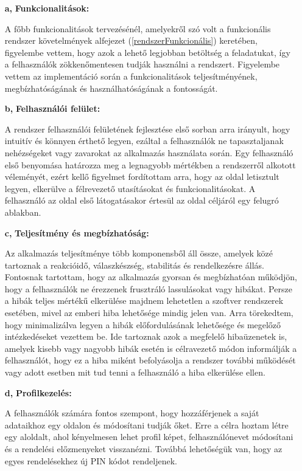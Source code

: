 \begin{itemize}
  	\item[\textbf{a,}] \textbf{Funkcionalitások:}

A főbb funkcionalitások tervezésénél, amelyekről szó volt a funkcionális rendszer követelmények alfejezet (\ref{rendszerFunkcionális}) keretében, figyelembe vettem, hogy azok a lehető legjobban betöltség a feladatukat, így a felhasználók zökkenőmentesen tudják használni a rendszert. Figyelembe vettem az implementáció során a funkcionalitások teljesítményének, megbízhatóságának és használhatóságának a fontosságát.

	\item[\textbf{b,}] \textbf{Felhasználói felület:}

A rendszer felhasználói felületének fejlesztése első sorban arra irányult, hogy intuitív és könnyen érthető legyen, ezáltal a felhasználók ne tapasztaljanak nehézségeket vagy zavarokat az alkalmazás használata során. Egy felhasználó első benyomása határozza meg a legnagyobb mértékben a rendszerről alkotott véleményét, ezért kellő figyelmet fordítottam arra, hogy az oldal letisztult legyen, elkerülve a félrevezető utasításokat és funkcionalitásokat. A felhasználó az oldal első látogatásakor értesül az oldal céljáról egy felugró ablakban.

	\item[\textbf{c,}] \textbf{Teljesítmény és megbízhatóság:}

Az alkalmazás teljesítménye több komponensből áll össze, amelyek közé tartoznak a reakcióidő, válaszkészség, stabilitás és rendelkezésre állás. Fontosnak tartottam, hogy az alkalmazás gyorsan és megbízhatóan működjön, hogy a felhasználók ne érezzenek frusztráló lassulásokat vagy hibákat. Persze a hibák teljes mértékű elkerülése majdnem lehetetlen a szoftver rendszerek esetében, mivel az emberi hiba lehetősége mindig jelen van. Arra törekedtem, hogy minimalizálva legyen a hibák előfordulásának lehetősége és megelőző intézkedéseket vezettem be. Ide tartoznak azok a megfelelő hibaüzenetek is, amelyek kisebb vagy nagyobb hibák esetén is célravezető módon informálják a felhasználót, hogy ez a hiba miként befolyásolja a rendszer további működését vagy adott esetben mit tud tenni a felhasználó a hiba elkerülése ellen.

	\item[\textbf{d,}] \textbf{Profilkezelés:}

A felhasználók számára fontos szempont, hogy hozzáférjenek a saját adataikhoz egy oldalon és módosítani tudják őket. Erre a célra hoztam létre egy aloldalt, ahol kényelmesen lehet profil képet, felhasználónevet módosítani és a rendelési előzmenyeket visszanézni. Továbbá lehetőségük van, hogy az egyes rendelésekhez új PIN kódot rendeljenek.


\end{itemize}
